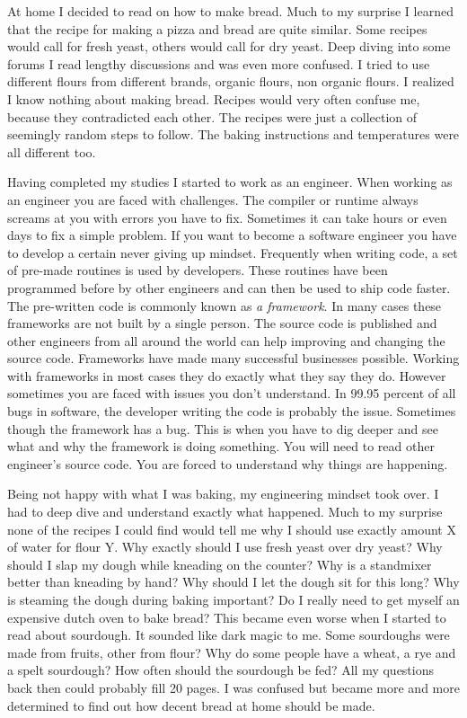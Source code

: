 At home I decided to read on how to make bread. Much to my surprise I learned
that the recipe for making a pizza and bread are quite similar. Some recipes
would call for fresh yeast, others would call for dry yeast. Deep diving
into some forums I read lengthy discussions and was even more confused.
I tried to use different flours from different brands, organic flours,
non organic flours. I realized I know nothing about making bread. Recipes
would very often confuse me, because they contradicted each other. The recipes
were just a collection of seemingly random steps to follow. The baking instructions
and temperatures were all different too.

Having completed my studies I started to work as an engineer.
When working as an engineer you are faced with challenges. The compiler or runtime
always screams at you with errors you have to fix. Sometimes it can take hours or
even days to fix a simple problem. If you want to become a software engineer
you have to develop a certain never giving up mindset. Frequently when writing code,
a set of pre-made routines is used by developers. These routines have been
programmed before by other engineers and can then be used to ship code faster.
The pre-written code is commonly known as {\it a framework}. In many cases
these frameworks are not built by a single person. The source code is published
and other engineers from all around the world can help improving and changing
the source code. Frameworks have made many successful businesses possible. Working
with frameworks in most cases they do exactly what they say they do. However
sometimes you are faced with issues you don't understand. In 99.95 percent
of all bugs in software, the developer writing the code is probably the issue.
Sometimes though the framework has a bug. This is when you have to dig deeper and
see what and why the framework is doing something. You will need to read other
engineer's source code. You are forced to understand why things are happening.

Being not happy with what I was baking, my engineering mindset took over. I had
to deep dive and understand exactly what happened. Much to my surprise none
of the recipes I could find would tell me why I should use exactly amount X
of water for flour Y. Why exactly should I use fresh yeast over dry yeast?
Why should I slap my dough while kneading on the counter? Why is a standmixer
better than kneading by hand?  Why should I let the dough sit for this long?
Why is steaming the dough during baking important? Do I really need to
get myself an expensive dutch oven to bake bread? This became even worse
when I started to read about sourdough. It sounded like dark magic to me.
Some sourdoughs were made from fruits, other from flour? Why do some
people have a wheat, a rye and a spelt sourdough? How often should the sourdough be
fed? All my questions back then could probably fill 20 pages. I was confused
but became more and more determined to find out how decent bread at home
should be made.


